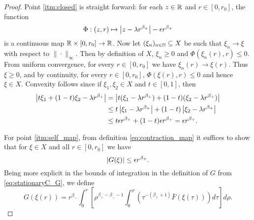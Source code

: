 \documentclass{amsart}
\begin{document}
\begin{proof}
Point \ref{itm:closed} is straight forward: for each \(z \in \mathbb{R}\) and \(r \in [0, r_0]\), the function
\[
\Phi : (z, r) \mapsto \left|{z - \lambda r^{\beta_+}}\right| - \epsilon r^{\beta_+}
\]
is a continuous map \(\mathbb{R} \times [0, r_0] \to \mathbb{R}\). Now let \((\xi_n)_{n \in \mathbb{N}} \subseteq X\) be such that \(\xi_n \to \xi\) with respect to \(\|\cdot \|_{\infty}\). Then by definition of \(X\), \(\xi_n \geq 0\) and \(\Phi(\xi_n(r), r) \leq 0\). From uniform convergence, for every \(r \in [0, r_0]\) we have \(\xi_n(r) \to \xi(r)\). Thus \(\xi \geq 0\), and by continuity, for every \(r \in [0, r_0]\), \(\Phi(\xi(r), r) \leq 0\) and hence \(\xi \in X\). Convexity follows since if \(\xi_1, \xi_2 \in X\) and \(t \in [0, 1]\), then
\[
\begin{split}
\left|{t\xi_1 + (1-t)\xi_2 - \lambda r^{\beta_+}}\right| &= \left|{t(\xi_1 - \lambda r^{\beta_+}) + (1-t)(\xi_2 - \lambda r^{\beta_+})}\right| \\
&\leq t \left|{\xi_1 - \lambda r^{\beta_+}}\right| + (1-t)\left|{\xi_2 - \lambda r^{\beta_+}}\right| \\
&\leq t \epsilon r^{\beta_+}  + (1-t)\epsilon r^{\beta_+} = \epsilon r^{\beta_+}.
\end{split}
\]

For point \ref{itm:self_map}, from definition \eqref{eq:contraction_map} it suffices to show that for \(\xi \in X\) and all \(r \in [0, r_0]\) we have
\begin{equation}
\label{eq:G_bdd}
\left|{G(\xi)}\right| \leq \epsilon r^{\beta_+}.
\end{equation}
Being more explicit in the bounds of integration in the definition of \(G\) from \eqref{eq:stationaryC_G}, we define
\begin{equation}
\label{eq:G_precise}
G(\xi(r)) = r^{\beta_-} \int_0^r \left[\rho^{\beta_+ - \beta_- - 1} \int_0^{\rho} \left(\tau^{-(\beta_+ + 1)} \bar{F}(\xi(\tau)) \right)d\tau\right] d\rho.
\end{equation}


\end{proof}
\end{document}
